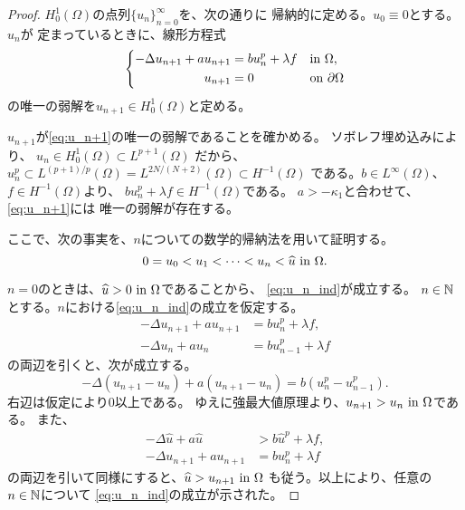 \begin{proof}
 $H_0^1(\Omega)$の点列$\{ u_n \}_{n=0}^\infty$を、次の通りに
 帰納的に定める。$u_0 \equiv 0$とする。$u_n$が
 定まっているときに、線形方程式
  \begin{align}
   \left\{
   \begin{aligned}
    -\Delta u_{n+1} + a u_{n+1} 
    &= b u_n^p + \lambda f  & &\text{in}~ \Omega,  \\
    u_{n+1} &= 0 & &\text{on}~ \partial\Omega
   \end{aligned}
   \right. \label{eq:u_n+1}
  \end{align}
 の唯一の弱解を$u_{n+1} \in H_0^1(\Omega)$と定める。
 
 $u_{n+1}$が\eqref{eq:u_n+1}の唯一の弱解であることを確かめる。
 ソボレフ埋め込みにより、
 $
  u_n \in H_0^1(\Omega) \subset L^{p+1}(\Omega)
 $
 だから、
 $
  u_n^p \subset L^{(p+1)/p}(\Omega)
 = L^{2N/(N+2)}(\Omega) \subset H^{-1}(\Omega)
 $
 である。$b \in L^\infty(\Omega)$、$f \in H^{-1}(\Omega)$より、
 $b u_n^p + \lambda f \in H^{-1}(\Omega)$である。
 $a > -\kappa_1$と合わせて、\eqref{eq:u_n+1}には
 唯一の弱解が存在する。

 ここで、次の事実を、$n$についての数学的帰納法を用いて証明する。
 \begin{equation}
  0 = u_0 < u_1 < \dots < u_n < \widehat{u} ~\text{in}~ \Omega. \label{eq:u_n_ind}
 \end{equation}

 $n = 0$のときは、$\widehat{u} > 0 ~\text{in}~ \Omega$であることから、
 \eqref{eq:u_n_ind}が成立する。
 $n \in \mathbb{N}$とする。$n$における\eqref{eq:u_n_ind}の成立を仮定する。
 \begin{align*}
  -\Delta u_{n+1} + a u_{n+1} &= b u_n^p + \lambda f, \\
  -\Delta u_{n} + a u_{n} &= b u_{n-1}^p + \lambda f
 \end{align*}
 の両辺を引くと、次が成立する。
 \[
  -\Delta (u_{n+1} - u_n) + a(u_{n+1} - u_n) 
 = b(u_n^p - u_{n-1}^p).
 \]
 右辺は仮定により$0$以上である。
 ゆえに強最大値原理より、$u_{n+1} > u_n ~\text{in}~\Omega$である。
 また、
 \begin{align*}
  -\Delta \hat{u} + a \hat{u} &> b \hat{u}^p + \lambda f, \\
  -\Delta u_{n+1} + a u_{n+1} &= b u_{n}^p + \lambda f
 \end{align*}
 の両辺を引いて同様にすると、$\widehat{u} > u_{n+1} ~\text{in}~ \Omega$
 も従う。以上により、任意の$n \in \mathbb{N}$について
 \eqref{eq:u_n_ind}の成立が示された。


\end{proof}
